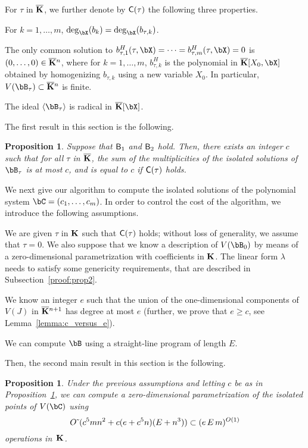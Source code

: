 \documentclass[12pt]{article}
\newtheorem{proposition}[definition]{Proposition}
\begin{document}
For $\tau$ in $\overline{\mathbf{K}}$, we further denote by $\mathsf{C}(\tau)$ the
following three properties.
\begin{description}[leftmargin=*]
\item[$\assG_1(\tau).$] For $k=1,\dots,m$,
  $\deg_\bX(b_k)=\deg_\bX(b_{\tau,k})$.
\item[$\assG_2(\tau).$] The only common solution to
  $b_{\tau,1}^H(\tau,\bX)=\cdots=b_{\tau,m}^H(\tau,\bX)=0$ is
  $(0,\dots,0)\in\overline{\mathbf{K}}{}^n$, where for $k=1,\dots,m$, $b_{\tau,k}^H$ is
  the polynomial in $\KKbar[X_0,\bX]$ obtained by homogenizing
  $b_{\tau,k}$ using a new variable $X_0$. In particular, $V(\bB_\tau)
  \subset \KKbar{}^n$ is finite.
\item[$\assG_3(\tau).$] The ideal $\langle \bB_\tau \rangle$ is
  radical in $\KKbar[\bX]$.
\end{description}

The first result in this section is the following.
\begin{proposition}\label{prop:degree_fiber}
  Suppose that $\mathsf{B}_1$ and $\mathsf{B}_2$ hold. Then, there exists an
  integer $c$ such that for all $\tau$ in $\overline{\mathbf{K}}$, the sum of the
  multiplicities of the isolated solutions of $\bB_\tau$ is at most
  $c$, and is equal to $c$ if $\mathsf{C}(\tau)$ holds.
\end{proposition}


We next give our algorithm to compute the isolated solutions of the
polynomial system $\bC=(c_1,\dots,c_m)$. In order to control the cost
of the algorithm, we introduce the following assumptions.
\begin{description}[leftmargin=*]
\item[${\assD}_1$.] We are given $\tau$ in $\mathbf{K}$ such that $\mathsf{C}(\tau)$
  holds; without loss of generality, we assume that $\tau=0$. We also
  suppose that we know a description of $V(\bB_{0})$ by means of a
  zero-dimensional parametrization with
  coefficients in $\mathbf{K}$. The linear form $\lambda$ needs to satisfy
  some genericity requirements, that are described in
  Subsection~\ref{proof:prop2}.
\item[${\assD}_2$.] We know an integer $e$ such that the union of the
  one-dimensional components of $V(J)$ in $\overline{\mathbf{K}}{}^{n+1}$ has degree
  at most $e$ (further, we prove that $e \ge c$, see Lemma~\ref{lemma:c_versus_e}).
\item[${\assD}_3$.] We can compute $\bB$ using a straight-line program
  of length $E$.
\end{description}
Then, the second main result in this section is the following.
\begin{proposition}\label{prop:compute_isolated}
  Under the previous assumptions and letting $c$ be as in
  Proposition~\ref{prop:degree_fiber}, we can compute a
  zero-dimensional parametrization of the isolated points of $V(\bC)$
  using
$${O}{\,\tilde{ }\,}(c^5 m n^2  + c(e+c^5 n)(E + n^3)) \subset (e\,E\,m)^{O(1)}$$ operations in~$\mathbf{K}$.
\end{proposition}
\end{document}
